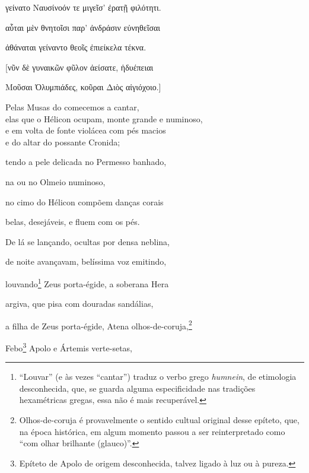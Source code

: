\begin{pages}
\begin{Leftside}
γείνατο Ναυσίνοόν τε μιγεῖσ' ἐρατῇ φιλότητι. 

αὗται μὲν θνητοῖσι παρ' ἀνδράσιν εὐνηθεῖσαι

ἀθάναται γείναντο θεοῖς ἐπιείκελα τέκνα. 

{[}νῦν δὲ γυναικῶν φῦλον ἀείσατε, ἡδυέπειαι

Μοῦσαι Ὀλυμπιάδες, κοῦραι Διὸς αἰγιόχοιο.{]}

            \pend
         \endnumbering
    \end{Leftside}
    \begin{Rightside}
        \beginnumbering
            \pstart
\noindent{}Pelas Musas do  comecemos a cantar, \\
elas que o Hélicon ocupam, monte grande e numinoso,\\
e em volta de fonte violácea com pés macios\\
 e do altar do possante Cronida;

tendo a pele delicada no Permesso banhado, 

na  ou no Olmeio numinoso,

no cimo do Hélicon compõem danças corais

belas, desejáveis, e fluem com os pés.

\quad{}De lá se lançando, ocultas por densa neblina,

de noite avançavam, belíssima voz emitindo, 

louvando\footnote{``Louvar'' (e às vezes ``cantar'') traduz o verbo grego
\emph{humnein}, de etimologia desconhecida, que, se guarda alguma
especificidade nas tradições hexamétricas gregas, essa não é mais
recuperável.} Zeus porta-égide, a soberana Hera

argiva, que pisa com douradas sandálias,

a filha de Zeus porta-égide, Atena olhos-de-coruja,\footnote{Olhos-de-coruja é provavelmente o sentido cultual original desse
epíteto, que, na época histórica, em algum momento passou a ser
reinterpretado como ``com olhar brilhante (glauco)''.}

Febo\footnote{Epíteto de Apolo de origem desconhecida, talvez ligado à luz
ou à pureza.} Apolo e Ártemis verte-setas,


\end{Rightside}
\end{pages}
